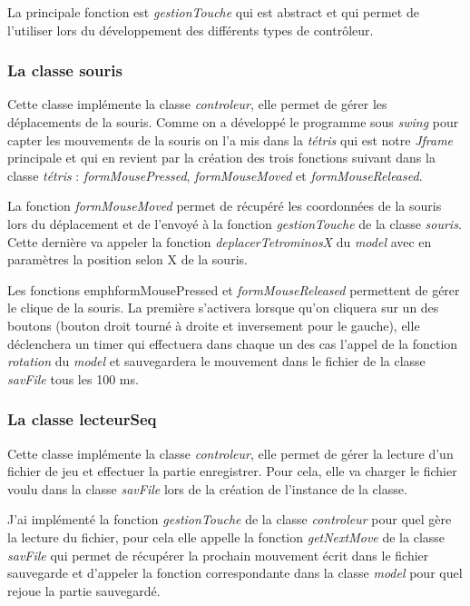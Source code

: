 \documentclass{article}           %
\begin{document}
La principale fonction est \emph{gestionTouche} qui est abstract et qui permet de l'utiliser lors du développement des différents types de contrôleur.

\subsubsection{La classe souris}
Cette classe implémente la classe \emph{controleur}, elle permet de gérer les déplacements de la souris. Comme on a développé le programme sous \emph{swing} pour capter les mouvements de la souris on l'a mis dans la \emph{tétris} qui est notre \emph{Jframe} principale et qui en revient par la création des trois fonctions suivant dans la classe \emph{tétris} : \emph{formMousePressed}, \emph{formMouseMoved} et \emph{formMouseReleased}.

La fonction \emph{formMouseMoved} permet de récupéré les coordonnées de la souris lors du déplacement et de l'envoyé à la fonction \emph{gestionTouche} de la classe \emph{souris}. Cette dernière va appeler la fonction \emph{deplacerTetrominosX} du \emph{model} avec en paramètres la position selon X de la souris.

Les fonctions emph{formMousePressed} et \emph{formMouseReleased} permettent de gérer le clique de la souris. La première s'activera lorsque qu'on cliquera sur un des boutons (bouton droit tourné à droite et inversement pour le gauche), elle déclenchera un timer qui effectuera dans chaque un des cas l'appel de la fonction \emph{rotation} du \emph{model} et sauvegardera le mouvement dans le fichier de la classe \emph{savFile} tous les 100 ms.

\subsubsection{La classe lecteurSeq}
Cette classe implémente la classe \emph{controleur}, elle permet de gérer la lecture d'un fichier de jeu et effectuer la partie enregistrer. Pour cela, elle va charger le fichier voulu dans la classe \emph{savFile} lors de la création de l'instance de la classe.

J'ai implémenté la fonction \emph{gestionTouche} de la classe \emph{controleur} pour quel gère la lecture du fichier, pour cela elle appelle la fonction \emph{getNextMove} de la classe \emph{savFile} qui permet de récupérer la prochain mouvement écrit dans le fichier sauvegarde et d'appeler la fonction correspondante dans la classe \emph{model} pour quel rejoue la partie sauvegardé.
\end{document}
